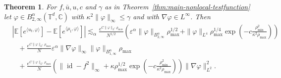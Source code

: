 \documentclass[a4paper,12pt]{article}
\newtheorem{theorem}{Theorem}[section]
\newcommand{\T}{\mathbb{T}}
\newcommand{\C}{\mathbb{C}}
\begin{document}
\begin{theorem}\label{thm:main-local-testfunction}
    For $f, \bar u, u, c$ and $\gamma$ as in Theorem~\ref{thm:main-nonlocal-testfunction} let $\varphi \in B^{\alpha}_{2,\infty}(\T^d,\C)$ with $\kappa^2\|\varphi\|_\infty \leq \gamma$ and with $\nabla \varphi \in L^\infty$. Then 
  \begin{align}\nonumber
    &| \mathbb{E} [e^{\langle u_t, \varphi \rangle}] -\mathbb{E} [e^{\langle
    \mu_t, \varphi \rangle}] |  \lesssim_{\alpha} \frac{e^{C\|\varphi\|_{L^1}\rho_{\max}}}{N^{1/2}}\left( \varepsilon^\alpha\|\varphi\|_{B_{2,\infty}^\alpha} \rho_{\max}^{1/2} + \|\varphi\|_{L^4}\rho_{\max}^{1/4}\exp\left(-c \frac{\rho_{\min}^2}{\kappa^2\rho_{\max}}\right)\right)\\ \nonumber
    & \hspace{10pt}+ \frac{e^{C \| \varphi \|_{L^1} \rho_{\max}}}{N}
    \varepsilon^{\alpha} \|\nabla \varphi\|_\infty \| \varphi \|_{B^{\alpha}_{1,\infty}}\rho_{\max} \\
    &\hspace{10pt} + \frac{e^{C \| \varphi \|_{L^1} \rho_{\max}}}{N}(\| \operatorname{id} - f^2 \|_{\infty} + \kappa \rho_{\max}^{1/2} \exp\left(-c \frac{\rho_{\min}^2}{\kappa^2\rho_{\max}}\right)) \| \nabla \varphi \|_{L^2}^2. \label{eq:main-local-testfunction} 
  \end{align}
\end{theorem}
\end{document}
